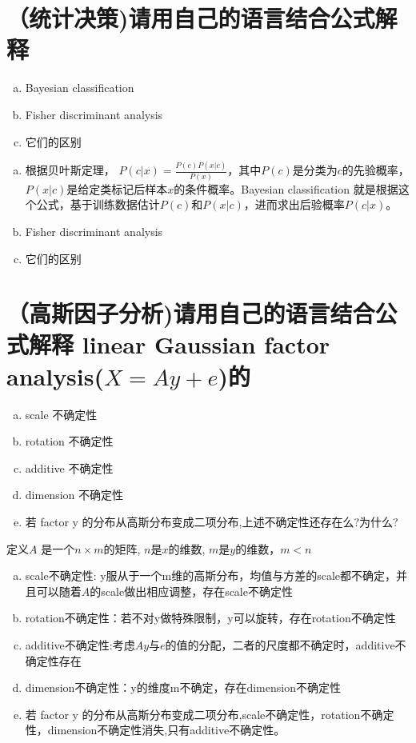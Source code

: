 \documentclass[11pt]{article}
\newenvironment{answer}{\par\color{MidnightBlue}}{\par}
\begin{document}
\section{（统计决策)请用自己的语言结合公式解释}
\begin{enumerate}[(a)]
    \item Bayesian classification
    \item Fisher discriminant	analysis
    \item 它们的区别
\end{enumerate}
\begin{answer}
\begin{enumerate}[(a)]
    \item 根据贝叶斯定理， $P(c|x)=\frac{P(c)P(x|c)}{P(x)}$，其中$P(c)$是分类为$c$的先验概率， $P(x|c)$是给定类标记后样本$x$的条件概率。Bayesian classification 就是根据这个公式，基于训练数据估计$P(c)$和$P(x|c)$，进而求出后验概率$P(c|x)$。
    \item Fisher discriminant	analysis
    \item 它们的区别
\end{enumerate}
\end{answer}

\section{（高斯因子分析)请用自己的语言结合公式解释 linear	Gaussian factor analysis($X=Ay+e$)的}
\begin{enumerate}[(a)]
    \item scale 不确定性
    \item rotation 不确定性
    \item additive 不确定性
    \item dimension 不确定性
    \item 若 factor y 的分布从高斯分布变成二项分布,上述不确定性还存在么?为什么?
\end{enumerate}
\begin{answer}
定义$A$ 是一个$n \times m$的矩阵, $n$是$x$的维数, $m$是$y$的维数，$m < n$
\begin{enumerate}[(a)]
\item scale不确定性: y服从于一个m维的高斯分布，均值与方差的scale都不确定，并且可以随着$A$的scale做出相应调整，存在scale不确定性
\item rotation不确定性：若不对y做特殊限制，y可以旋转，存在rotation不确定性
\item additive不确定性:考虑$Ay$与$e$的值的分配，二者的尺度都不确定时，additive不确定性存在
\item dimension不确定性：y的维度m不确定，存在dimension不确定性
\item 若 factor y 的分布从高斯分布变成二项分布,scale不确定性，rotation不确定性，dimension不确定性消失,只有additive不确定性。
\end{enumerate}
\end{answer}
\end{document}
